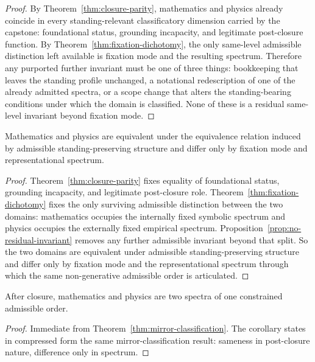 \begin{proof}
By Theorem~\ref{thm:closure-parity}, mathematics and physics already coincide in every standing-relevant classificatory dimension carried by the capstone: foundational status, grounding incapacity, and legitimate post-closure function. By Theorem~\ref{thm:fixation-dichotomy}, the only same-level admissible distinction left available is fixation mode and the resulting spectrum. Therefore any purported further invariant must be one of three things: bookkeeping that leaves the standing profile unchanged, a notational redescription of one of the already admitted spectra, or a scope change that alters the standing-bearing conditions under which the domain is classified. None of these is a residual same-level invariant beyond fixation mode.
\end{proof}

\begin{theorem}
\label{thm:mirror-classification}
Mathematics and physics are equivalent under the equivalence relation induced by admissible standing-preserving structure and differ only by fixation mode and representational spectrum.
\end{theorem}

\begin{proof}
Theorem~\ref{thm:closure-parity} fixes equality of foundational status, grounding incapacity, and legitimate post-closure role. Theorem~\ref{thm:fixation-dichotomy} fixes the only surviving admissible distinction between the two domains: mathematics occupies the internally fixed symbolic spectrum and physics occupies the externally fixed empirical spectrum. Proposition~\ref{prop:no-residual-invariant} removes any further admissible invariant beyond that split. So the two domains are equivalent under admissible standing-preserving structure and differ only by fixation mode and the representational spectrum through which the same non-generative admissible order is articulated.
\end{proof}

\begin{corollary}
\label{cor:eadem}
After closure, mathematics and physics are two spectra of one constrained admissible order.
\end{corollary}

\begin{proof}
Immediate from Theorem~\ref{thm:mirror-classification}. The corollary states in compressed form the same mirror-classification result: sameness in post-closure nature, difference only in spectrum.
\end{proof}

